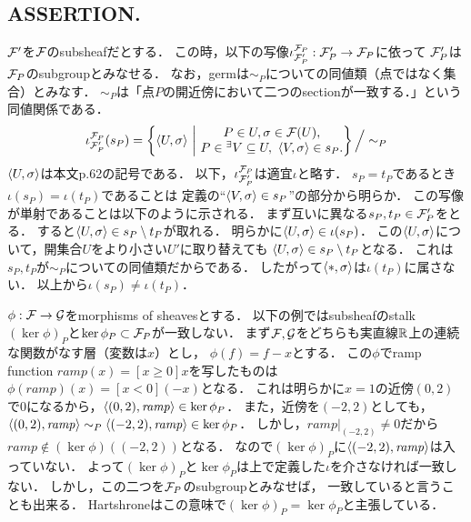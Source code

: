 \documentclass[a4paper]{jsarticle}
\begin{document}
    \subsection{ASSERTION.}
    $\mathcal{F}'$を$\mathcal{F}$のsubsheafだとする．
    この時，以下の写像$\iota_{\mathcal{F}'_P}^{\mathcal{F}_P}: \mathcal{F}'_P \to \mathcal{F}_P$に依って
    $\mathcal{F}'_P$は$\mathcal{F}_P$のsubgroupとみなせる．
    なお，germは$\sim_P$についての同値類（点ではなく集合）とみなす．
    $\sim_P$は「点$P$の開近傍において二つのsectionが一致する．」という同値関係である．
    \[
    \iota_{\shF'_P}^{\shF_P}(s_P)=
        \left\{ \germ{U}{\sigma} ~\middle|~ 
            \begin{array}{@{}c@{}}
                P \in U, \sigma \in \shF(U), \\ 
                P \in {}^{\exists}{V} \subseteq U,~ \germ{V}{\sigma} \in s_P.
            \end{array}
        \right\}
        \Big/ \sim_P
    \]
    $\langle U,\sigma \rangle$は本文p.62の記号である．
    以下，$\iota_{\mathcal{F}'_P}^{\mathcal{F}_P}$は適宜$\iota$と略す．
    $s_P=t_P$であるとき$\iota(s_P)=\iota(t_P)$であることは
    定義の``$\langle V,\sigma \rangle \in s_P$''の部分から明らか．
    この写像が単射であることは以下のように示される．
    まず互いに異なる$s_P, t_P \in \mathcal{F}'_P$をとる．
    すると$\langle U,\sigma \rangle \in s_P \setminus t_P$が取れる．
    明らかに$\langle U,\sigma \rangle \in \iota(s_P)$．
    この$\langle U,\sigma \rangle$について，開集合$U$をより小さい$U'$に取り替えても
    $\langle U,\sigma \rangle \in s_P \setminus t_P$となる．
    これは$s_P, t_P$が$\sim_P$についての同値類だからである．
    したがって$\langle *,\sigma \rangle$は$\iota(t_P)$に属さない．
    以上から$\iota(s_P) \neq \iota(t_P)$．

    $\phi: \mathcal{F} \to \mathcal{G}$をmorphisms of sheavesとする．
    以下の例ではsubsheafのstalk $(\ker \phi)_P$と$\ker \phi_P \subset \mathcal{F}_P$が一致しない．
    まず$\mathcal{F}, \mathcal{G}$をどちらも実直線$\mathbb{R}$上の連続な関数がなす層（変数は$x$）とし，
    $\phi(f)=f-x$とする．
    この$\phi$でramp function $\mathit{ramp}(x)=[x \geq 0]x$を写したものは
    $\phi(\mathit{ramp})(x)=[x<0](-x)$となる．
    これは明らかに$x=1$の近傍$(0,2)$で0になるから，$\langle (0,2),\mathit{ramp} \rangle \in \ker \phi_P$．
    また，近傍を$(-2,2)$としても，
    $\langle (0,2),\mathit{ramp} \rangle \sim_P \langle (-2,2),\mathit{ramp} \rangle \in \ker \phi_P$．
    しかし，$\mathit{ramp}|_{(-2,2)} \neq 0$だから
    $\mathit{ramp} \not \in (\ker \phi)((-2,2))$となる．
    なので$(\ker \phi)_P$に$\langle (-2,2),\mathit{ramp} \rangle$は入っていない．
    よって$(\ker \phi)_P$と$\ker \phi_P$は上で定義した$\iota$を介さなければ一致しない．
    しかし，この二つを$\mathcal{F}_P$のsubgroupとみなせば，
    一致していると言うことも出来る．
    Hartshroneはこの意味で$(\ker \phi)_P=\ker \phi_P$と主張している．
\end{document}
